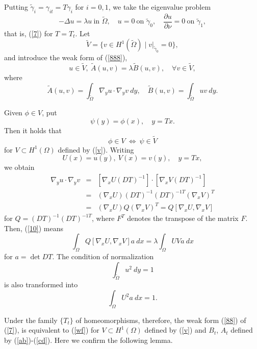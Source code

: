 \documentclass[final,a4paper]{jmsj}
\theoremstyle{thmstyleone}%
\theoremstyle{thmstyletwo}%
\theoremstyle{thmstylethree}%
\begin{document}
Putting $\tilde \gamma_i=\gamma_{it}=T\gamma_i$ for $i=0,1$, we take the eigenvalue problem  
\begin{equation} 
-\Delta u=\lambda u \ \mbox{in $\tilde \Omega$}, \quad u=0 \ \mbox{on $\tilde \gamma_0$}, \quad \frac{\partial u}{\partial \nu}=0 \ \mbox{on $\tilde\gamma_1$}, 
 \label{888}
\end{equation}  
that is, (\ref{7}) for $T=T_t$. Let 
\[ \tilde V=\{ v\in H^1(\tilde\Omega) \mid \left. v\right\vert_{\tilde \gamma_0}=0 \}, \] 
and introduce the weak form of (\ref{888}),  
\begin{equation} 
u\in \tilde V, \ \tilde A(u,v)=\lambda\tilde B(u,v), \quad \forall v\in \tilde V, 
 \label{10}
\end{equation} 
where  
\begin{equation} 
\tilde A(u,v)=\int_{\tilde\Omega} \nabla_y u\cdot \nabla_y v \ dy, \quad \tilde B(u,v)=\int_{\tilde\Omega} uv \ dy. 
 \label{12}
\end{equation}
 
Given $\phi\in V$, put 
\[ \psi(y)=\phi(x), \quad y=Tx. \] 
Then it holds that   
\[ \phi\in V \ \Leftrightarrow \ \psi\in \tilde V \] 
for $V\subset H^1(\Omega)$ defined by (\ref{v}). Writing 
\begin{equation} 
U(x)=u(y),  \  V(x)=v(y), \quad y=Tx, 
 \label{hoshi}
\end{equation} 
we obtain 
\begin{eqnarray*} 
\nabla_yu\cdot \nabla_yv & = & [\nabla_xU(DT)^{-1}]\cdot [\nabla_xV(DT)^{-1}] \\ 
& = & (\nabla_xU)(DT)^{-1}(DT)^{-1T}(\nabla_x V)^T \\ 
& = & (\nabla_xU)Q(\nabla_xV)^T=Q[\nabla_xU, \nabla_xV] 
\end{eqnarray*} 
for $Q=(DT)^{-1}(DT)^{-1T}$, where $F^T$ denotes the transpose of the matrix $F$. Then, (\ref{10}) means 
\[ \int_\Omega Q[\nabla_x U, \nabla_x V] a \ dx=\lambda\int_\Omega UVa \ dx \] 
for $a=\det DT$. The condition of normalization 
\[ \int_{\tilde \Omega}u^2 \ dy=1 \] 
is also transformed into  
\[ \int_\Omega U^2a \ dx=1. \] 

Under the family $\{T_t\}$ of homeomorphisms, therefore, the  weak form (\ref{88}) of (\ref{7}), is equivalent to (\ref{wf}) for $V\subset H^1(\Omega)$ defined by (\ref{v}) and $B_t$, $A_t$ defined by (\ref{ab})-(\ref{cd}). Here we confirm the following lemma. 
\end{document}
